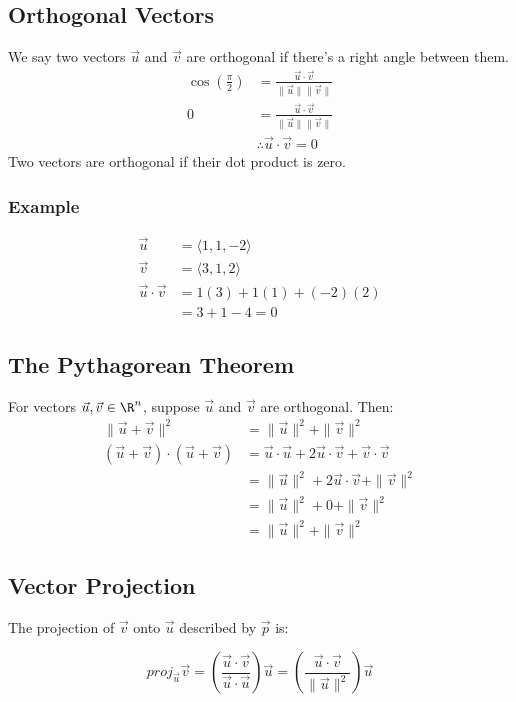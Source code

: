 \documentclass{math}
\begin{document}
\subsection*{Orthogonal Vectors}
We say two vectors \( \vec{u} \) and \( \vec{v} \) are orthogonal if there's
a right angle between them.
\begin{align*}
  \cos(\frac{\pi}{2}) &= \frac{\vec{u}\cdot\vec{v}}{\|\vec{u}\|\|\vec{v}\|} \\
  0 &= \frac{\vec{u}\cdot\vec{v}}{\|\vec{u}\|\|\vec{v}\|} \\
  &\therefore \vec{u}\cdot\vec{v} = 0
\end{align*}
Two vectors are orthogonal if their dot product is zero.

\subsubsection*{Example}
\begin{align*}
  \vec{u} &= \langle1,1,-2\rangle \\
  \vec{v} &= \langle3,1,2\rangle \\
  \vec{u}\cdot\vec{v} &= 1(3)+1(1)+(-2)(2) \\
  &= 3+1-4 = 0
\end{align*}

\subsection*{The Pythagorean Theorem}
For vectors \( \vec{u},\vec{v}\in\R^n \), suppose \( \vec{u} \) and
\( \vec{v} \) are orthogonal. Then:
\begin{align*}
  \|\vec{u}+\vec{v}\|^2 &= \|\vec{u}\|^2+\|\vec{v}\|^2 \\
  (\vec{u}+\vec{v})\cdot(\vec{u}+\vec{v}) &=
    \vec{u}\cdot\vec{u}+2\vec{u}\cdot\vec{v}+\vec{v}\cdot\vec{v} \\
  &= \|\vec{u}\|^2+2\vec{u}\cdot\vec{v}+\|\vec{v}\|^2 \\
  &= \|\vec{u}\|^2+0+\|\vec{v}\|^2 \\
  &= \|\vec{u}\|^2+\|\vec{v}\|^2
\end{align*}

\subsection*{Vector Projection}
The projection of \( \vec{v} \) onto \( \vec{u} \) described by \( \vec{p} \)
is:
\begin{center}
\end{center}
\[ proj_{\vec{u}}\vec{v} =
  (\frac{\vec{u}\cdot\vec{v}}{\vec{u}\cdot\vec{u}})\vec{u} =
  (\frac{\vec{u}\cdot\vec{v}}{\|\vec{u}\|^2})\vec{u} \]
\end{document}
